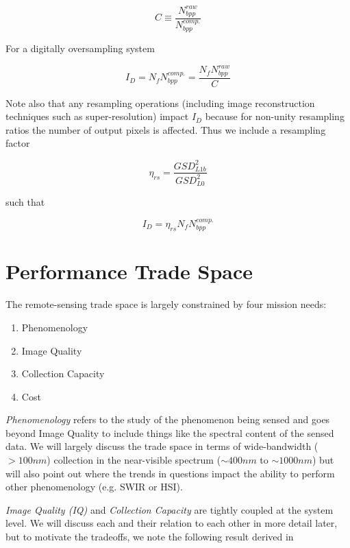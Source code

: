 \documentclass[10pt,journal]{IEEEtran}  %
\begin{document}
\begin{equation}
    \label{eq:compression}
    C \equiv \frac{N_{bpp}^{raw}}{N_{bpp}^{comp.}}
\end{equation}

For a digitally oversampling system

\begin{equation}
    I_D = N_f N_{bpp}^{comp.} = \frac{N_f N_{bpp}^{raw}}{C}
\end{equation}

Note also that any resampling operations (including image reconstruction techniques such as super-resolution) impact $I_D$ because for non-unity resampling ratios the number of output pixels is affected.  Thus we include a resampling factor

$${\eta}_{rs} = \frac{GSD_{L1b}^2}{GSD_{L0}^2}$$

such that

\begin{equation}
    I_D = {\eta}_{rs} N_f N_{bpp}^{comp.}
\end{equation}

\section{Performance Trade Space}
\label{sec:trade_space}

The remote-sensing trade space is largely constrained by four mission needs:

\begin{enumerate}
\item Phenomenology
\item Image Quality
\item Collection Capacity
\item Cost
\end{enumerate}

\emph{Phenomenology} refers to the study of the phenomenon being sensed and goes beyond Image Quality to include things like the spectral content of the sensed data.  We will largely discuss the trade space in terms of wide-bandwidth ($>100nm$) collection in the near-visible spectrum ($\sim 400nm$ to $\sim 1000nm$) but will also point out where the trends in questions impact the ability to perform other phenomenology (e.g. SWIR or HSI).

\emph{Image Quality (IQ)} and \emph{Collection Capacity} are tightly coupled at the system level.  We will discuss each and their relation to each other in more detail later, but to motivate the tradeoffs, we note the following result derived in \cite{shaw}
\end{document}
